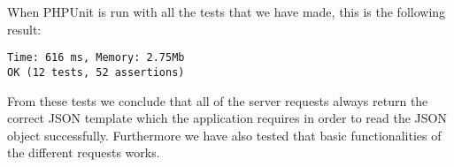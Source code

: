 When PHPUnit is run with all the tests that we have made, this is the following result:
\begin{lstlisting}[numbers=none, basicstyle=\ttfamily, caption={The result of our PHPUnit test}]
Time: 616 ms, Memory: 2.75Mb
OK (12 tests, 52 assertions)
\end{lstlisting}
From these tests we conclude that all of the server requests always return the correct JSON template which the application requires in order to read the JSON object successfully. Furthermore we have also tested that basic functionalities of the different requests works.

